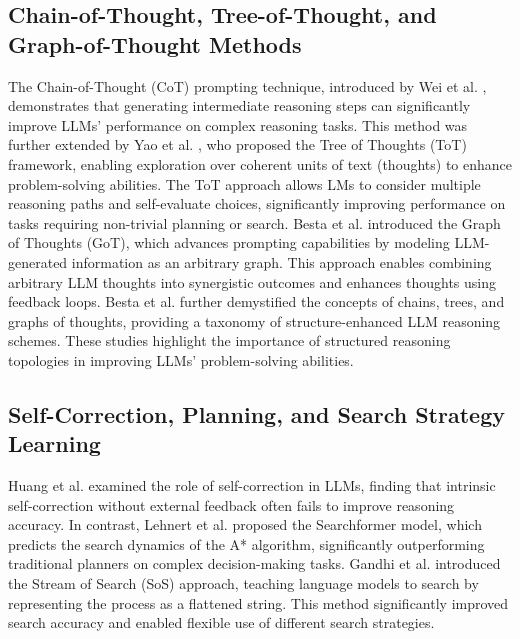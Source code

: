 \subsection{Chain-of-Thought, Tree-of-Thought, and Graph-of-Thought Methods}
The Chain-of-Thought (CoT) prompting technique, introduced by Wei et al. \cite{wei2022chain}, demonstrates that generating intermediate reasoning steps can significantly improve LLMs' performance on complex reasoning tasks. This method was further extended by Yao et al. \cite{yao2024tree}, who proposed the Tree of Thoughts (ToT) framework, enabling exploration over coherent units of text (thoughts) to enhance problem-solving abilities. The ToT approach allows LMs to consider multiple reasoning paths and self-evaluate choices, significantly improving performance on tasks requiring non-trivial planning or search. Besta et al. \cite{besta2024graph} introduced the Graph of Thoughts (GoT), which advances prompting capabilities by modeling LLM-generated information as an arbitrary graph. This approach enables combining arbitrary LLM thoughts into synergistic outcomes and enhances thoughts using feedback loops. Besta et al. \cite{besta2024demystifying} further demystified the concepts of chains, trees, and graphs of thoughts, providing a taxonomy of structure-enhanced LLM reasoning schemes. These studies highlight the importance of structured reasoning topologies in improving LLMs' problem-solving abilities.

\subsection{Self-Correction, Planning, and Search Strategy Learning}
Huang et al. \cite{huang2024large} examined the role of self-correction in LLMs, finding that intrinsic self-correction without external feedback often fails to improve reasoning accuracy. In contrast, Lehnert et al. \cite{searchformer} proposed the Searchformer model, which predicts the search dynamics of the A* algorithm, significantly outperforming traditional planners on complex decision-making tasks. Gandhi et al. \cite{gandhi2024stream} introduced the Stream of Search (SoS) approach, teaching language models to search by representing the process as a flattened string. This method significantly improved search accuracy and enabled flexible use of different search strategies.